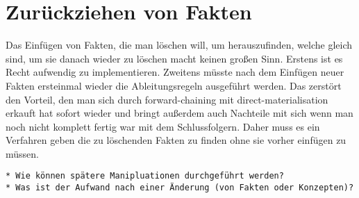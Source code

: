 \section{Zurückziehen von Fakten}
Das Einfügen von Fakten, die man löschen will, um herauszufinden, welche gleich sind, um sie danach wieder zu löschen macht keinen großen Sinn. Erstens ist es Recht aufwendig zu implementieren. Zweitens müsste nach dem Einfügen neuer Fakten ersteinmal wieder die Ableitungsregeln ausgeführt werden. Das zerstört den Vorteil, den man sich durch forward-chaining mit direct-materialisation erkauft hat sofort wieder und bringt außerdem auch Nachteile mit sich wenn man noch nicht komplett fertig war mit dem Schlussfolgern.
Daher muss es ein Verfahren geben die zu löschenden Fakten zu finden ohne sie vorher einfügen zu müssen.
\begin{verbatim} 
* Wie können spätere Manipluationen durchgeführt werden?
* Was ist der Aufwand nach einer Änderung (von Fakten oder Konzepten)?
\end{verbatim}
